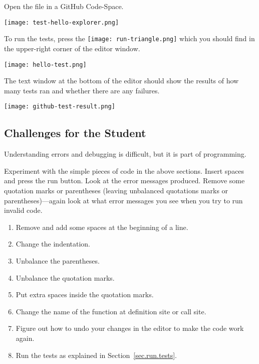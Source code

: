 Open the file  in a GitHub Code-Space.

\noindent\texttt{[image: test-hello-explorer.png]}

To run the tests, press the
\texttt{[image: run-triangle.png]} which you should find in
the upper-right corner of the editor window.

\noindent\texttt{[image: hello-test.png]}


The text window at the bottom of the editor should show the results of
how many tests ran and whether there are any failures.

\noindent\texttt{[image: github-test-result.png]}



\subsection{Challenges for the Student}

Understanding errors and debugging is difficult, but it is part of
programming.

Experiment with the simple pieces of code in the above sections.
Insert spaces and press the run button.  Look at the error messages
produced. Remove some quotation marks or parentheses (leaving
unbalanced quotations marks or parentheses)---again look at what error
messages you see when you try to run invalid code.


\begin{enumerate}
\item Remove and add some spaces at the beginning of a line.
\item Change the indentation.
\item Unbalance the parentheses.
\item Unbalance the quotation marks.
\item Put extra spaces inside the quotation marks.
\item Change the name of the  function at definition site
  or call site.
\item Figure out how to undo your changes in the editor to make the
  code work again.
\item Run the tests  as explained in
  Section~\ref{sec.run.tests}.
\end{enumerate}

\clearpage



